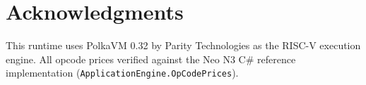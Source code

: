 \documentclass[11pt,a4paper]{article}
\begin{document}
\section*{Acknowledgments}

This runtime uses PolkaVM 0.32 by Parity Technologies as the RISC-V execution engine.
All opcode prices verified against the Neo N3 C\# reference implementation (\texttt{ApplicationEngine.OpCodePrices}).
\end{document}
